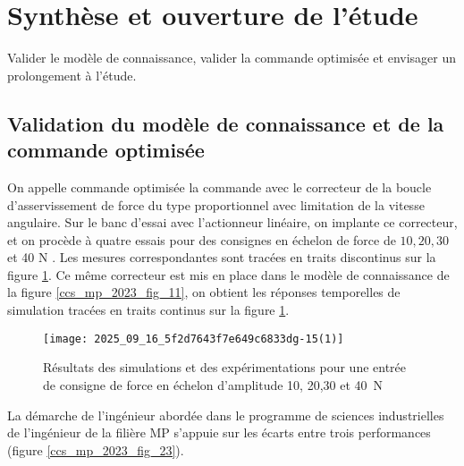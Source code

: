\section{Synthèse et ouverture de l'étude}
\begin{obj}
Valider le modèle de connaissance, valider la commande optimisée et envisager un prolongement à l'étude.
\end{obj}

\subsection{Validation du modèle de connaissance et de la commande optimisée}%
On appelle commande optimisée la commande avec le correcteur de la boucle d'asservissement de force du type proportionnel avec limitation de la vitesse angulaire. Sur le banc d'essai avec l'actionneur linéaire, on implante ce correcteur, et on procède à quatre essais pour des consignes en échelon de force de $10,20,30$ et 40 N . Les mesures correspondantes sont tracées en traits discontinus sur la figure \ref{ccs_mp_2023_fig_22}. Ce même correcteur est mis en place dans le modèle de connaissance de la figure \ref{ccs_mp_2023_fig_11}, on obtient les réponses temporelles de simulation tracées en traits continus sur la figure \ref{ccs_mp_2023_fig_22}.


\begin{figure}[!h]
\centering
\texttt{[image: 2025\_09\_16\_5f2d7643f7e649c6833dg-15(1)]}
\caption{\label{ccs_mp_2023_fig_22}   Résultats des simulations et des expérimentations pour une entrée de consigne de force en échelon d'amplitude 10, 20,30 et \SI{40}{N}}
\end{figure}



La démarche de l'ingénieur abordée dans le programme de sciences industrielles de l'ingénieur de la filière MP s'appuie sur les écarts entre trois performances (figure \ref{ccs_mp_2023_fig_23}).

